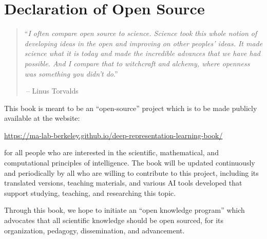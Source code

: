 \documentclass[../../book-main.tex]{subfiles}
\begin{document}
\chapter*{Declaration of Open Source}

\begin{quote}
    ``{\em I often compare open source to science. Science took this
        whole notion of developing ideas in the open and improving on
        other peoples' ideas. It made science what it is today and made
        the incredible advances that we have had possible. And I compare
        that to witchcraft and alchemy, where openness was something you
    didn't do}.''

    $~$\hfill -- Linus Torvalds
\end{quote}
\vspace{5mm}

This book is meant to be an ``open-source'' project which is to be
made publicly available at the website:
\begin{center}
    \url{https://ma-lab-berkeley.github.io/deep-representation-learning-book/}
\end{center}
for all people who are interested in the scientific, mathematical,
and computational principles of intelligence. The book will be
updated continuously and periodically by all who are willing to
contribute to this project, including its translated versions,
teaching materials, and various AI tools developed that support
studying, teaching, and
researching this topic.

Through this book, we hope to initiate an ``open knowledge program''
which advocates that all scientific knowledge should be open sourced,
for its organization, pedagogy, dissemination, and advancement.
\end{document}
